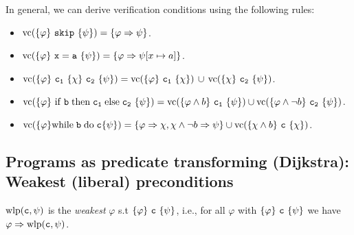 
\begin{definition}
    In general, we can derive verification conditions using the following rules:
\begin{itemize}
    \item $\mathrm{vc}(\{\varphi\} ~\mathtt{{\mathtt{skip}}}~ \{\psi\}) = \{\varphi \Rightarrow \psi\}$.
    \item $\mathrm{vc}(\{\varphi\} ~\mathtt{x=a}~ \{\psi\}) = \{\varphi \Rightarrow \psi[x \mapsto a]\}$.
    \item $\mathrm{vc}(\{\varphi\} ~\mathtt{c_1}~ \{\chi\} ~\mathtt{ c_2 }~ \{\psi\}) = \mathrm{vc}(\{\varphi\}~\mathtt{c_1}~ \{\chi\})\,  \cup \, \mathrm{vc}(\{\chi\} ~\mathtt{c_2}~ \{\psi\})$.
    \item $\mathrm{vc}(\{\varphi\} ~\mathrm{if}\;\mathtt{b}\;\mathrm{then}\;\mathtt{c_1}\;\mathrm{else}\;\mathtt{c_2}~ \{\psi\}) = \mathrm{vc}(\{\varphi\land b\} ~\mathtt{c_1}~ \{\psi\}) \cup \mathrm{vc}(\{\varphi \land \neg b\}~\mathtt{c_2}~ \{\psi\})$.
    \item $\mathrm{vc}(\{\varphi\} \mathrm{while}\;\mathtt{b}\;\mathrm{do}\;\mathtt{c} \{\psi\}) = \{\varphi \Rightarrow \chi, \chi \land \neg b \Rightarrow \psi\} \cup \mathrm{vc}(\{\chi \land b\} ~\mathtt{c}~ \{\chi\})$.
\end{itemize}
\end{definition}



\subsection{Programs as predicate transforming (Dijkstra): Weakest (liberal) preconditions}

\begin{definition} $\mathrm{wlp}(\mathtt{c}, \psi)$ is the \textit{weakest} $\varphi$ s.t $\{\varphi\} ~\mathtt{c}~ \{\psi\}$, i.e., for all $\varphi$ with $\{\varphi\} ~\mathtt{c}~\{\psi\}$ we have $ \varphi \Rightarrow \mathrm{wlp}(\mathtt{c}, \psi)$.
\end{definition}

